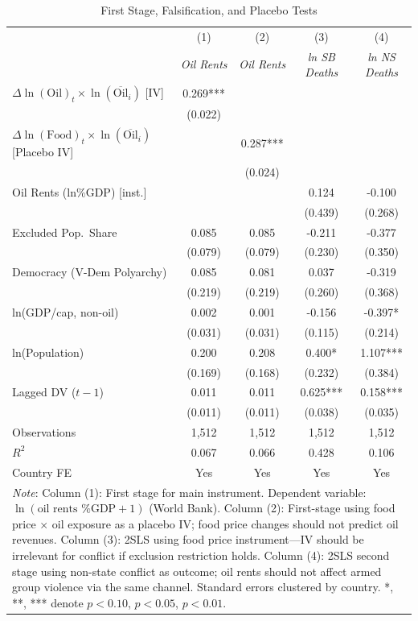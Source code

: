 \begin{table}[htbp]\centering\small
\caption{First Stage, Falsification, and Placebo Tests}\label{tab:diagnostics}
\begin{tabular}{lcccc}
\toprule
 & (1) & (2) & (3) & (4) \\
 & \textit{Oil Rents} & \textit{Oil Rents} & \textit{ln SB Deaths} & \textit{ln NS Deaths} \\
\midrule
$\Delta\ln(\text{Oil})_t \times \ln(\overline{\text{Oil}}_i)$ [IV] & 0.269*** &  &  &  \\
 & (0.022) &  &  &  \\
$\Delta\ln(\text{Food})_t \times \ln(\overline{\text{Oil}}_i)$ [Placebo IV] &  & 0.287*** &  &  \\
 &  & (0.024) &  &  \\
Oil Rents (ln\%GDP) [inst.] &  &  & 0.124 & -0.100 \\
 &  &  & (0.439) & (0.268) \\
Excluded Pop.\ Share & 0.085 & 0.085 & -0.211 & -0.377 \\
 & (0.079) & (0.079) & (0.230) & (0.350) \\
Democracy (V-Dem Polyarchy) & 0.085 & 0.081 & 0.037 & -0.319 \\
 & (0.219) & (0.219) & (0.260) & (0.368) \\
ln(GDP/cap, non-oil) & 0.002 & 0.001 & -0.156 & -0.397* \\
 & (0.031) & (0.031) & (0.115) & (0.214) \\
ln(Population) & 0.200 & 0.208 & 0.400* & 1.107*** \\
 & (0.169) & (0.168) & (0.232) & (0.384) \\
Lagged DV ($t-1$) & 0.011 & 0.011 & 0.625*** & 0.158*** \\
 & (0.011) & (0.011) & (0.038) & (0.035) \\
\midrule
Observations & 1,512 & 1,512 & 1,512 & 1,512 \\
$R^2$ & 0.067 & 0.066 & 0.428 & 0.106 \\
Country FE & Yes & Yes & Yes & Yes \\
\bottomrule
\multicolumn{5}{p{0.95\linewidth}}{\footnotesize
\textit{Note}: Column (1): First stage for main instrument. Dependent variable: $\ln(\text{oil rents }\%\text{GDP}+1)$ (World Bank). Column (2): First-stage using food price $\times$ oil exposure as a placebo IV; food price changes should not predict oil revenues. Column (3): 2SLS using food price instrument---IV should be irrelevant for conflict if exclusion restriction holds. Column (4): 2SLS second stage using non-state conflict as outcome; oil rents should not affect armed group violence via the same channel. Standard errors clustered by country. *, **, *** denote $p<0.10$, $p<0.05$, $p<0.01$.}
\end{tabular}
\end{table}